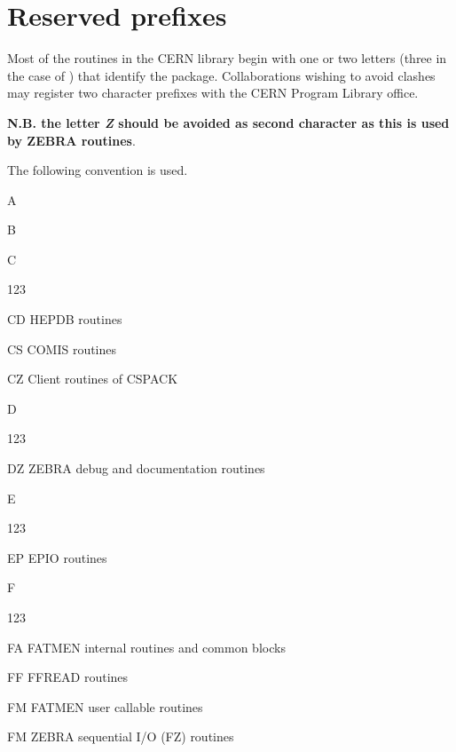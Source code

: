 \chapter{Reserved prefixes}

\label{sect-PREFIX}

Most of the routines in the CERN library begin with
one or two letters (three in the case of \HPLOT{})
that identify the package. Collaborations wishing
to avoid clashes may register two character prefixes
with the CERN Program Library office.

{\bf N.B. the letter {\it Z} should be avoided as
second character as this is used by ZEBRA routines}.

The following convention is used. 

\begin{DLtt}{1}
\item[A]

\item[B]

\item[C]

\begin{DLtt}{123}
\item[CD]HEPDB routines
\item[CS]COMIS routines
\item[CZ]Client routines of CSPACK
\end{DLtt}

\item[D]

\begin{DLtt}{123}
\item[DZ]ZEBRA debug and documentation routines
\end{DLtt}

\item[E]

\begin{DLtt}{123}
\item[EP]EPIO routines
\end{DLtt}

\item[F]

\begin{DLtt}{123}
\item[FA]FATMEN internal routines and common blocks
\item[FF]FFREAD routines
\item[FM]FATMEN user callable routines
\item[FM]ZEBRA sequential I/O (FZ) routines
\end{DLtt}


\end{DLtt}
